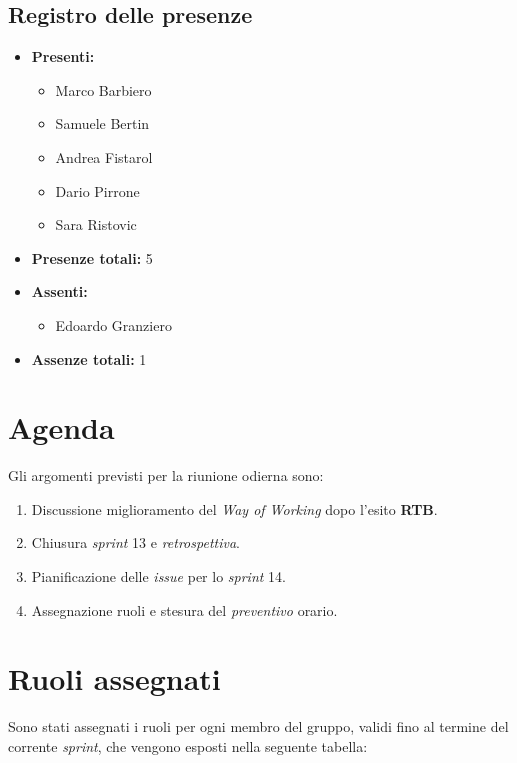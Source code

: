 \documentclass[12pt, a4paper]{article}
\begin{document}
\subsection{Registro delle presenze}
\begin{itemize}
\item \textbf{Presenti:}
\begin{itemize}
    \item Marco Barbiero
    \item Samuele Bertin
    \item Andrea Fistarol
    \item Dario Pirrone
    \item Sara Ristovic
\end{itemize}
\item \textbf{Presenze totali:} 5

\item \textbf{Assenti:}
\begin{itemize}
    \item Edoardo Granziero
\end{itemize}
\item \textbf{Assenze totali:} 1
\end{itemize}

\section{Agenda}
Gli argomenti previsti per la riunione odierna sono:
\begin{enumerate}
    \item Discussione miglioramento del \textit{Way of Working} dopo l'esito \textbf{RTB}.
    \item Chiusura \textit{sprint} 13 e \textit{retrospettiva}.
    \item Pianificazione delle \textit{issue} per lo \textit{sprint} 14.
    \item Assegnazione ruoli e stesura del \textit{preventivo} orario.
\end{enumerate}

\newpage
\section{Ruoli assegnati}
Sono stati assegnati i ruoli per ogni membro del gruppo, validi fino al termine del corrente \textit{sprint}, che vengono esposti nella seguente tabella:
\end{document}
